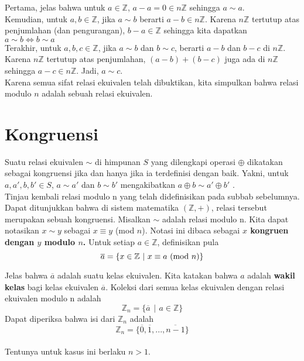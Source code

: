 	Pertama, jelas bahwa untuk $a \in \mathbb{Z}$, $a - a = 0 \in n\mathbb{Z}$ sehingga $a \sim a$.
	\\
	
	Kemudian, untuk $a,b \in \mathbb{Z}$, jika $a \sim b$ berarti $a - b \in n\mathbb{Z}$. Karena $n\mathbb{Z}$ tertutup atas penjumlahan (dan pengurangan), $b - a \in \mathbb{Z}$ sehingga kita dapatkan $a \sim b \iff b \sim a$
	\\
	
	Terakhir, untuk $a,b,c \in \mathbb{Z}$, jika $a \sim b$ dan $b \sim c$, berarti $a - b $ dan $b - c$ di $n\mathbb{Z}$. Karena $n\mathbb{Z}$ tertutup atas penjumlahan, $(a - b) + (b - c)$ juga ada di $n\mathbb{Z}$ sehingga $a - c \in n\mathbb{Z}$. Jadi, $a \sim c$.
	\\
	
	Karena semua sifat relasi ekuivalen telah dibuktikan, kita simpulkan bahwa relasi modulo $n$ adalah sebuah relasi ekuivalen.
	\section{Kongruensi}
	Suatu relasi ekuivalen $\sim$ di himpunan $S$ yang dilengkapi operasi $\oplus$ dikatakan sebagai kongruensi jika dan hanya jika ia terdefinisi dengan baik. Yakni, untuk $a,a',b,b' \in S$, $a \sim a'$ dan $b \sim b'$ mengakibatkan $a \oplus b \sim a' \oplus b'$ .
	\\
	
	Tinjau kembali relasi modulo n yang telah didefinisikan pada subbab sebelumnya. Dapat ditunjukkan bahwa di sistem matematika $(\mathbb{Z},+)$, relasi tersebut merupakan sebuah kongruensi. Misalkan $\sim$ adalah relasi modulo n. Kita dapat notasikan $x \sim y$ sebagai $x \equiv y$ (mod $n$). Notasi ini dibaca sebagai \textbf{$x$ kongruen dengan $y$ modulo $n$.} Untuk setiap $a \in \mathbb{Z}$, definisikan pula
	$$\overline{a} = \{ x \in \mathbb{Z} \ | \ x \equiv a \ \textnormal{(mod }n) \}$$
	
	Jelas bahwa $\overline{a}$ adalah suatu kelas ekuivalen. Kita katakan bahwa $a$ adalah \textbf{wakil kelas} bagi kelas ekuivalen $\overline{a}$. Koleksi dari semua kelas ekuivalen dengan relasi ekuivalen modulo n adalah
	$$\mathbb{Z}_n = \{ \overline{a} \ \, | \, \ a \in \mathbb{Z}  \}$$
	Dapat diperiksa bahwa isi dari $\mathbb{Z}_n$ adalah $$\mathbb{Z}_n = \{\overline{0}, \overline{1}, ..., \overline{n-1} \}$$
	\\
	
	Tentunya untuk kasus ini berlaku $n > 1$.
	
